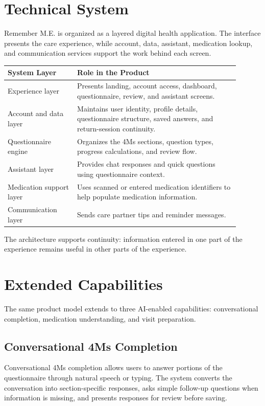 \documentclass[11pt]{article}
\begin{document}
\section{Technical System}

Remember M.E. is organized as a layered digital health application. The interface presents the care experience, while account, data, assistant, medication lookup, and communication services support the work behind each screen.

\begin{longtable}{p{0.27\linewidth}p{0.63\linewidth}}
\toprule
\textbf{System Layer} & \textbf{Role in the Product} \\
\midrule
Experience layer & Presents landing, account access, dashboard, questionnaire, review, and assistant screens. \\
Account and data layer & Maintains user identity, profile details, questionnaire structure, saved answers, and return-session continuity. \\
Questionnaire engine & Organizes the 4Ms sections, question types, progress calculations, and review flow. \\
Assistant layer & Provides chat responses and quick questions using questionnaire context. \\
Medication support layer & Uses scanned or entered medication identifiers to help populate medication information. \\
Communication layer & Sends care partner tips and reminder messages. \\
\bottomrule
\end{longtable}

The architecture supports continuity: information entered in one part of the experience remains useful in other parts of the experience.

\section{Extended Capabilities}

The same product model extends to three AI-enabled capabilities: conversational completion, medication understanding, and visit preparation.

\subsection{Conversational 4Ms Completion}

Conversational 4Ms completion allows users to answer portions of the questionnaire through natural speech or typing. The system converts the conversation into section-specific responses, asks simple follow-up questions when information is missing, and presents responses for review before saving.
\end{document}
